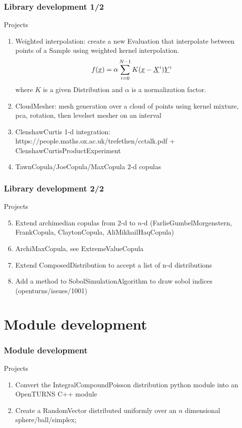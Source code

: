 \documentclass[8pt]{beamer}
\begin{document}
\begin{frame}
  \frametitle{Library development 1/2}
  \begin{block}{Projects}
    \begin{enumerate}
      \item Weighted interpolation: create a new Evaluation that interpolate between points of a Sample using weighted kernel interpolation.
        \begin{equation}
          f({\underline{x}})=\alpha\sum_{i=0}^{N-1}K({\underline{x}}-{\underline{X}}^i){\underline{Y}}^i
        \end{equation}
where $K$ is a given Distribution and $\alpha$ is a normalization factor.
      \item CloudMesher: mesh generation over a cloud of points using kernel mixture, pca, rotation, then levelset mesher on an interval
      \item ClenshawCurtis 1-d integration: https://people.maths.ox.ac.uk/trefethen/cctalk.pdf + ClenshawCurtisProductExperiment
      \item TawnCopula/JoeCopula/MaxCopula 2-d copulas
    \end{enumerate}
  \end{block}
\end{frame}

\begin{frame}
  \frametitle{Library development 2/2}
  \begin{block}{Projects}
    \begin{enumerate}
      \setcounter{enumi}{4}
      \item Extend archimedian copulas from 2-d to $n$-d (FarlieGumbelMorgenstern, FrankCopula, ClaytonCopula, AliMikhailHaqCopula)
      \item ArchiMaxCopula, see ExtremeValueCopula
      \item Extend ComposedDistribution to accept a list of n-d distributions
      \item Add a method to SobolSimulationAlgorithm to draw sobol indices (openturns/issues/1001)
    \end{enumerate}
  \end{block}
\end{frame}



\section{Module development}

\begin{frame}
  \frametitle{Module development}
  \begin{block}{Projects}
    \begin{enumerate}
      \item Convert the IntegralCompoundPoisson distribution python module into an OpenTURNS C++ module
      \item Create a RandomVector distributed uniformly over an $n$ dimensional sphere/ball/simplex;
    \end{enumerate}
  \end{block}
\end{frame}
\end{document}
